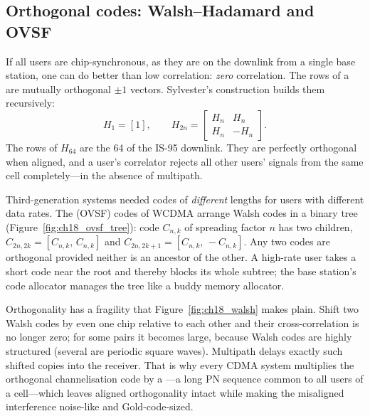 
\subsection{Orthogonal codes: Walsh--Hadamard and OVSF}

If all users are chip-synchronous, as they are on the downlink from a single base station,
one can do better than low correlation: \emph{zero} correlation. The rows of a
 are mutually orthogonal $\pm1$ vectors. Sylvester's construction
builds them recursively:
\begin{equation}
H_1=[1],\qquad H_{2n}=\begin{bmatrix}H_n&H_n\\H_n&-H_n\end{bmatrix}.
\end{equation}
The rows of $H_{64}$ are the 64  of the IS-95 downlink. They are perfectly
orthogonal when aligned, and a user's correlator rejects all other users' signals from the
same cell completely---in the absence of multipath.

Third-generation systems needed codes of \emph{different} lengths for users with different
data rates. The  (OVSF) codes of WCDMA arrange
Walsh codes in a binary tree (Figure~\ref{fig:ch18_ovsf_tree}): code $C_{n,k}$ of spreading factor
$n$ has two children, $C_{2n,2k}=[C_{n,k},\,C_{n,k}]$ and $C_{2n,2k+1}=[C_{n,k},\,-C_{n,k}]$. Any
two codes are orthogonal provided neither is an ancestor of the other. A high-rate user takes a
short code near the root and thereby blocks its whole subtree; the base station's code allocator
manages the tree like a buddy memory allocator.

Orthogonality has a fragility that Figure~\ref{fig:ch18_walsh} makes plain. Shift two Walsh
codes by even one chip relative to each other and their cross-correlation is no longer zero;
for some pairs it becomes large, because Walsh codes are highly structured (several are
periodic square waves). Multipath delays exactly such shifted copies into the receiver. That
is why every CDMA system multiplies the orthogonal channelisation code by a
---a long PN sequence common to all users of a cell---which leaves
aligned orthogonality intact while making the misaligned interference noise-like and
Gold-code-sized.

